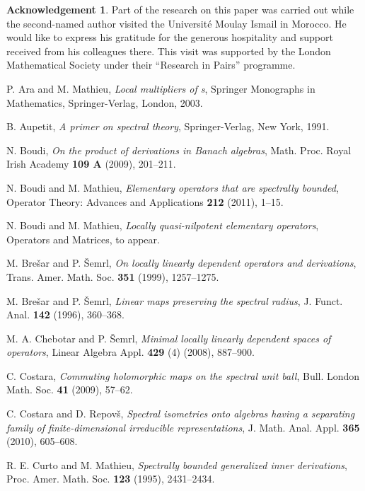 \documentclass[a4paper,12pt,reqno]{amsart}
\numberwithin{equation}{section}
\theoremstyle{definition}
\newtheorem*{acknowledgement}{Acknowledgement}
\begin{document}
\begin{acknowledgement}
Part of the research on this paper was carried out while the second-named author visited the Universit\' e Moulay Ismail
in Morocco. He would like to express his gratitude for the generous hospitality and support received from his colleagues there.
This visit was supported by the London Mathematical Society under their ``Research in Pairs'' programme.
\end{acknowledgement}

\begin{thebibliography}{25}

P. Ara and M. Mathieu, \textit{Local multipliers of \C*s},
Springer Monographs in Mathematics, Springer-Verlag, London, 2003.

B. Aupetit, \textit{A primer on spectral theory}, Springer-Verlag, New York, 1991.

N. Boudi, \textit{On the product of derivations in Banach algebras},
Math. Proc. Royal Irish Academy \textbf{109 A} (2009), 201--211.

N. Boudi and M. Mathieu, \textit{Elementary operators that are spectrally bounded},
Operator Theory: Advances and Applications \textbf{212} (2011), 1--15.

N. Boudi and M. Mathieu, \textit{Locally quasi-nilpotent elementary operators},
Operators and Matrices, to appear.

M. Bre\v{s}ar and P. \v{S}emrl, \textit{On locally linearly dependent operators and derivations},
Trans. Amer. Math. Soc. \textbf{351} (1999), 1257--1275.

M. Bre\v{s}ar and P. \v{S}emrl, \textit{Linear maps preserving the spectral radius},
J. Funct. Anal. {\bf 142} (1996), 360--368.

M. A. Chebotar and P. \v{S}emrl, \textit{Minimal locally linearly dependent spaces of operators},
Linear Algebra Appl. \textbf{429} (4) (2008), 887--900.

C. Costara, \textit{Commuting holomorphic maps on the spectral unit ball},
Bull. London Math. Soc. {\bf41} (2009), 57--62.

C. Costara and D. Repov\v s,
\textit{Spectral isometries onto algebras having a separating family of finite-dimensional irreducible representations},
J. Math. Anal. Appl. {\bf365} (2010), 605--608.

R. E. Curto and M. Mathieu, \textit{Spectrally bounded generalized inner derivations},
Proc. Amer. Math. Soc. {\bf 123} (1995), 2431--2434.


\end{thebibliography}
\end{document}
